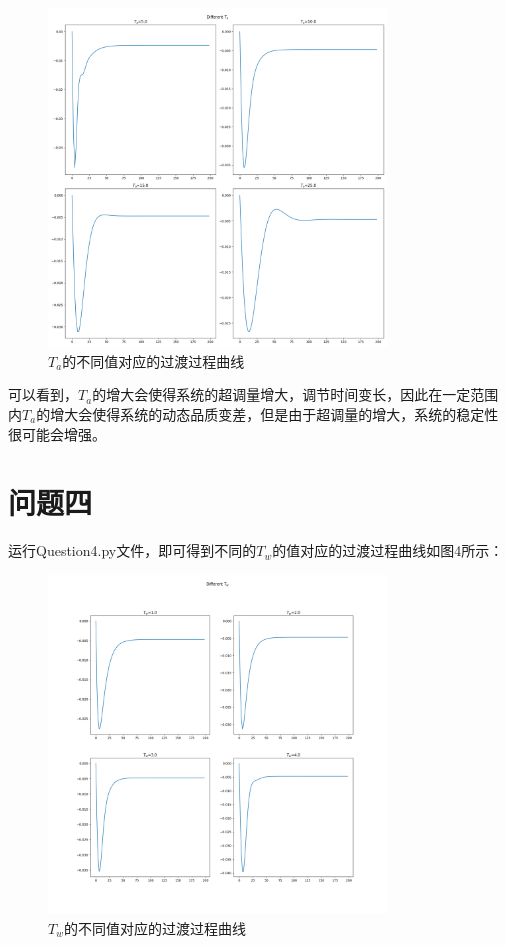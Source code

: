 \documentclass[UTF8]{ctexart}
\begin{document}
\begin{figure}[htbp]
    \centering
    \includegraphics[width=0.8\textwidth]{pic/dif_ta.png}
    \caption{$T_a$的不同值对应的过渡过程曲线}
\end{figure}

可以看到，$T_a$的增大会使得系统的超调量增大，调节时间变长，因此在一定范围内$T_a$的增大会使得系统的动态品质变差，但是由于超调量的增大，系统的稳定性很可能会增强。

\section{问题四}

运行Question4.py文件，即可得到不同的$T_w$的值对应的过渡过程曲线如图4所示：

\begin{figure}[htbp]
    \centering
    \includegraphics[width=0.8\textwidth]{pic/dif_tw.png}
    \caption{$T_w$的不同值对应的过渡过程曲线}
\end{figure}
\end{document}
